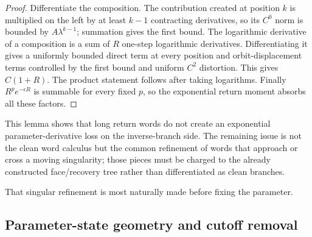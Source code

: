 \documentclass[11pt]{article}
\begin{document}
\begin{proof}
Differentiate the composition.  The contribution created at position $k$ is
multiplied on the left by at least $k-1$ contracting derivatives, so its
$C^0$ norm is bounded by $A\lambda^{k-1}$; summation gives the first bound.
The logarithmic derivative of a composition is a sum of $R$ one-step
logarithmic derivatives.  Differentiating it gives a uniformly bounded direct
term at every position and orbit-displacement terms controlled by the first
bound and uniform $C^2$ distortion.  This gives $C(1+R)$.  The product
statement follows after taking logarithms.  Finally
$R^p e^{-\epsilon R}$ is summable for every fixed $p$, so the exponential
return moment absorbs all these factors.
\end{proof}

This lemma shows that long return words do not create an exponential
parameter-derivative loss on the inverse-branch side.  The remaining issue is
not the clean word calculus but the common refinement of words that approach
or cross a moving singularity; those pieces must be charged to the already
constructed face/recovery tree rather than differentiated as clean branches.

That singular refinement is most naturally made before fixing the parameter.

\subsection{Parameter-state geometry and cutoff removal}
\label{sec:parameter-state}
\end{document}
